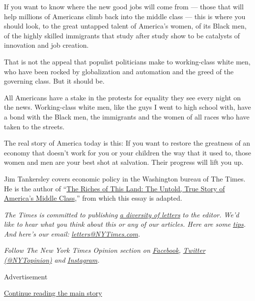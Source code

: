 If you want to know where the new good jobs will come from --- those
that will help millions of Americans climb back into the middle class
--- this is where you should look, to the great untapped talent of
America's women, of its Black men, of the highly skilled immigrants that
study after study show to be catalysts of innovation and job creation.

That is not the appeal that populist politicians make to working-class
white men, who have been rocked by globalization and automation and the
greed of the governing class. But it should be.

All Americans have a stake in the protests for equality they see every
night on the news. Working-class white men, like the guys I went to high
school with, have a bond with the Black men, the immigrants and the
women of all races who have taken to the streets.

The real story of America today is this: If you want to restore the
greatness of an economy that doesn't work for you or your children the
way that it used to, those women and men are your best shot at
salvation. Their progress will lift you up.

Jim Tankersley covers economic policy in the Washington bureau of The
Times. He is the author of
``\href{https://www.publicaffairsbooks.com/titles/jim-tankersley/the-riches-of-this-land/9781541767836/}{The
Riches of This Land: The Untold, True Story of America's Middle
Class},'' from which this essay is adapted.

\emph{The Times is committed to publishing}
\href{https://www.nytimes3xbfgragh.onion/2019/01/31/opinion/letters/letters-to-editor-new-york-times-women.html}{\emph{a
diversity of letters}} \emph{to the editor. We'd like to hear what you
think about this or any of our articles. Here are some}
\href{https://help.nytimes3xbfgragh.onion/hc/en-us/articles/115014925288-How-to-submit-a-letter-to-the-editor}{\emph{tips}}\emph{.
And here's our email:}
\href{mailto:letters@NYTimes.com}{\emph{letters@NYTimes.com}}\emph{.}

\emph{Follow The New York Times Opinion section on}
\href{https://www.facebookcorewwwi.onion/nytopinion}{\emph{Facebook}}\emph{,}
\href{http://twitter.com/NYTOpinion}{\emph{Twitter (@NYTopinion)}}
\emph{and}
\href{https://www.instagram.com/nytopinion/}{\emph{Instagram}}\emph{.}

Advertisement

\protect\hyperlink{after-bottom}{Continue reading the main story}


